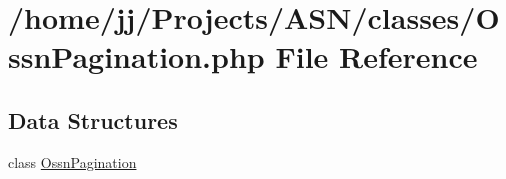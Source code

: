 \hypertarget{_ossn_pagination_8php}{}\section{/home/jj/\+Projects/\+A\+S\+N/classes/\+Ossn\+Pagination.php File Reference}
\label{_ossn_pagination_8php}
\subsection*{Data Structures}
\begin{DoxyCompactItemize}
\item 
class \hyperlink{class_ossn_pagination}{Ossn\+Pagination}
\end{DoxyCompactItemize}
